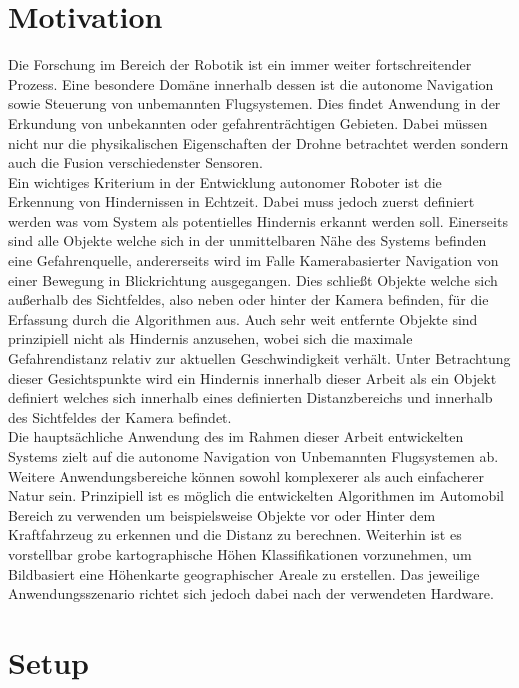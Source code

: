 \section{Motivation}
\label{sec:uav}

Die Forschung im Bereich der Robotik ist ein immer weiter fortschreitender Prozess. Eine besondere Domäne innerhalb dessen ist die autonome Navigation sowie Steuerung von unbemannten Flugsystemen. Dies findet Anwendung in der Erkundung von unbekannten oder gefahrenträchtigen Gebieten. Dabei müssen nicht nur die physikalischen Eigenschaften der Drohne betrachtet werden sondern auch die Fusion verschiedenster Sensoren. \\

Ein wichtiges Kriterium in der Entwicklung autonomer Roboter ist die Erkennung von Hindernissen in Echtzeit. Dabei muss jedoch zuerst definiert werden was vom System als potentielles Hindernis erkannt werden soll. Einerseits sind alle Objekte welche sich in der unmittelbaren Nähe des Systems befinden eine Gefahrenquelle, andererseits wird im Falle Kamerabasierter Navigation von einer Bewegung in Blickrichtung ausgegangen. Dies schließt Objekte welche sich außerhalb des Sichtfeldes, also neben oder hinter der Kamera befinden, für die Erfassung durch die Algorithmen aus. Auch sehr weit entfernte Objekte sind prinzipiell nicht als Hindernis anzusehen, wobei sich die maximale Gefahrendistanz relativ zur aktuellen Geschwindigkeit verhält. Unter Betrachtung dieser Gesichtspunkte wird ein Hindernis innerhalb dieser Arbeit als ein Objekt definiert welches sich innerhalb eines definierten Distanzbereichs und innerhalb des Sichtfeldes der Kamera befindet. \\

Die hauptsächliche Anwendung des im Rahmen dieser Arbeit entwickelten Systems zielt auf die autonome Navigation von Unbemannten Flugsystemen ab. Weitere Anwendungsbereiche können sowohl komplexerer als auch einfacherer Natur sein. Prinzipiell ist es möglich die entwickelten Algorithmen im Automobil Bereich zu verwenden um beispielsweise Objekte vor oder Hinter dem Kraftfahrzeug zu erkennen und die Distanz zu berechnen. Weiterhin ist es vorstellbar grobe kartographische Höhen Klassifikationen vorzunehmen, um Bildbasiert eine Höhenkarte geographischer Areale zu erstellen. Das jeweilige Anwendungsszenario richtet sich jedoch dabei nach der verwendeten Hardware. 

\section{Setup}
\label{sec:applications}



